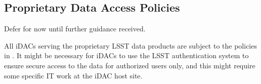 \subsection{Proprietary Data Access Policies}
{\color{red}Defer for now until further guidance received.} \newline

All iDACs serving the proprietary LSST data products are subject to the policies in . It might be necessary for iDACs to use the LSST authentication system to ensure secure access to the data for authorized users only, and this might require some specific IT work at the iDAC host site.



